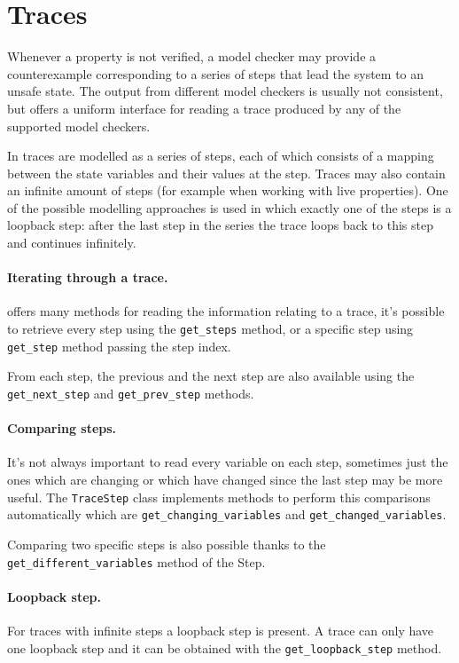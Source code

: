 \section{Traces}
Whenever a property is not verified, a model checker may provide a counterexample corresponding to a series of steps that lead the system to an unsafe state.
The output from different model checkers is usually not consistent, but \pyvmt{} offers a uniform interface for reading a trace produced by any of the supported model checkers.

In \pyvmt{} traces are modelled as a series of steps, each of which consists of a mapping between the state variables and their values at the step.
Traces may also contain an infinite amount of steps (for example when working with live properties).
One of the possible modelling approaches is used in which exactly one of the steps is a loopback step: after the last step in the series the trace loops back to this step and continues infinitely.

\paragraph*{Iterating through a trace.}
\pyvmt{} offers many methods for reading the information relating to a trace, it's possible to retrieve every step using the \texttt{get\_steps} method, or a specific step using \texttt{get\_step} method passing the step index.

From each step, the previous and the next step are also available using the \texttt{get\_next\_step} and \texttt{get\_prev\_step} methods.

\paragraph*{Comparing steps.}
It's not always important to read every variable on each step, sometimes just the ones which are changing or which have changed since the last step may be more useful.
The \texttt{TraceStep} class implements methods to perform this comparisons automatically which are \texttt{get\_changing\_variables} and \texttt{get\_changed\_variables}.

Comparing two specific steps is also possible thanks to the \texttt{get\_different\_variables} method of the Step.

\paragraph*{Loopback step.}
For traces with infinite steps a loopback step is present. A trace can only have one loopback step and it can be obtained with the \texttt{get\_loopback\_step} method.

